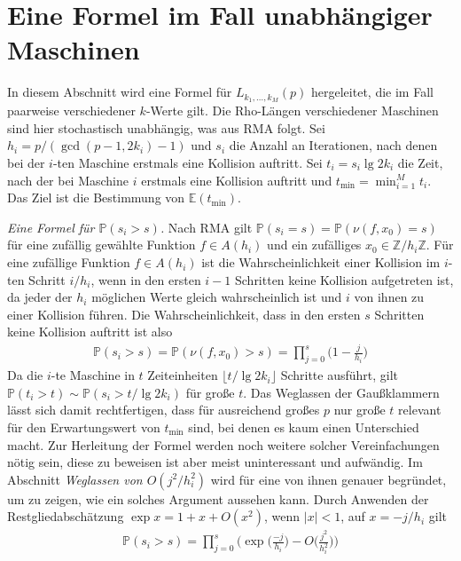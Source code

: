 \documentclass[a4paper, 11pt, ngerman]{article}
\newcommand{\E}{\mathbb{E}}
\newcommand{\Z}{\mathbb{Z}}
\renewcommand{\P}{\mathbb{P}}
\begin{document}
\section{Eine Formel im Fall unabhängiger Maschinen}

In diesem Abschnitt wird eine Formel für $L_{k_1, \dots, k_M}(p)$ hergeleitet, die im Fall paarweise verschiedener $k$-Werte gilt. Die Rho-Längen verschiedener Maschinen sind hier stochastisch unabhängig, was aus RMA folgt. Sei $h_i = p/(\gcd(p - 1, 2k_i) - 1)$ und $s_i$ die Anzahl an Iterationen, nach denen bei der $i$-ten Maschine erstmals eine Kollision auftritt. Sei $t_i = s_i \lg 2k_i$ die Zeit, nach der bei Maschine $i$ erstmals eine Kollision auftritt und $t_{\min} = \min_{i = 1}^M t_i$. Das Ziel ist die Bestimmung von $\E(t_{\min})$.

\emph{Eine Formel für $\P(s_i > s)$.} Nach RMA gilt $\P(s_i = s) = \P(\nu(f, x_0) = s)$ für eine zufällig gewählte Funktion $f \in A(h_i)$ und ein zufälliges $x_0 \in \Z/h_i\Z$. Für eine zufällige Funktion $f \in A(h_i)$ ist die Wahrscheinlichkeit einer Kollision im $i$-ten Schritt $i/h_i$, wenn in den ersten $i-1$ Schritten keine Kollision aufgetreten ist, da jeder der $h_i$ möglichen Werte gleich wahrscheinlich ist und $i$ von ihnen zu einer Kollision führen. Die Wahrscheinlichkeit, dass in den ersten $s$ Schritten keine Kollision auftritt ist also
\begin{align*}
    \P(s_i > s)
    = \P(\nu(f, x_0) > s)
    = \prod_{j = 0}^s \bigg (1 - \frac {j} {h_i} \bigg )
\end{align*}
Da die $i$-te Maschine in $t$ Zeiteinheiten $\lfloor t / \lg 2k_i \rfloor$ Schritte ausführt, gilt $\P(t_i > t) \sim \P(s_i > t / \lg 2k_i)$ für große $t$. Das Weglassen der Gaußklammern lässt sich damit rechtfertigen, dass für ausreichend großes $p$ nur große $t$ relevant für den Erwartungswert von $t_{\min}$ sind, bei denen es kaum einen Unterschied macht. Zur Herleitung der Formel werden noch weitere solcher Vereinfachungen nötig sein, diese zu beweisen ist aber meist uninteressant und aufwändig. Im Abschnitt \emph{Weglassen von $O(j^2/h_i^2)$} wird für eine von ihnen genauer begründet, um zu zeigen, wie ein solches Argument aussehen kann. Durch Anwenden der Restgliedabschätzung $\exp x = 1 + x + O(x^2)$, wenn $|x| < 1$, auf $x = -j/h_i$ gilt
\begin{align*}
    \P(s_i > s)
    = \prod_{j = 0}^{s} \Bigg ( \exp \bigg ( \frac {-j}{h_i} \bigg )
    - O \bigg ( \frac {j^2} {h_i^2} \bigg ) \Bigg )
\end{align*}
\end{document}
